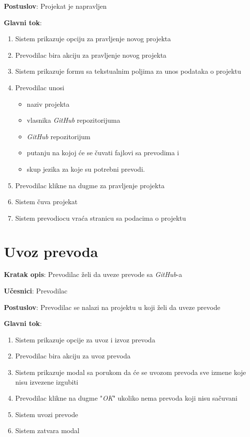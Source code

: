 \textbf{Postuslov}: Projekat je napravljen

\textbf{Glavni tok}:
\begin{enumerate}
    \item Sistem prikazuje opciju za pravljenje novog projekta
    \item Prevodilac bira akciju za pravljenje novog projekta
    \item Sistem prikazuje formu sa tekstualnim poljima za unos podataka o projektu
    \item Prevodilac unosi 
    \begin{itemize}
        \item naziv projekta
        \item vlasnika \textit{GitHub} repozitorijuma
        \item \textit{GitHub} repozitorijum
        \item putanju na kojoj će se čuvati fajlovi sa prevodima i
        \item skup jezika za koje su potrebni prevodi.
    \end{itemize}
    \item Prevodilac klikne na dugme za pravljenje projekta
    \item Sistem čuva projekat
    \item Sistem prevodiocu vraća stranicu sa podacima o projektu
\end{enumerate}


\section{Uvoz prevoda}

\textbf{Kratak opis}: Prevodilac želi da uveze prevode sa \textit{GitHub}-a

\textbf{Učesnici}: Prevodilac

\textbf{Postuslov}: Prevodilac se nalazi na projektu u koji želi da uveze prevode

\textbf{Glavni tok}:
\begin{enumerate}
    \item Sistem prikazuje opcije za uvoz i izvoz prevoda
    \item Prevodilac bira akciju za uvoz prevoda
    \item Sistem prikazuje modal sa porukom da će se uvozom prevoda sve 
    izmene koje nisu izvezene izgubiti
    \item Prevodilac klikne na dugme "\textit{OK}" ukoliko nema prevoda koji nisu sačuvani
    \item Sistem uvozi prevode
    \item Sistem zatvara modal
\end{enumerate}

